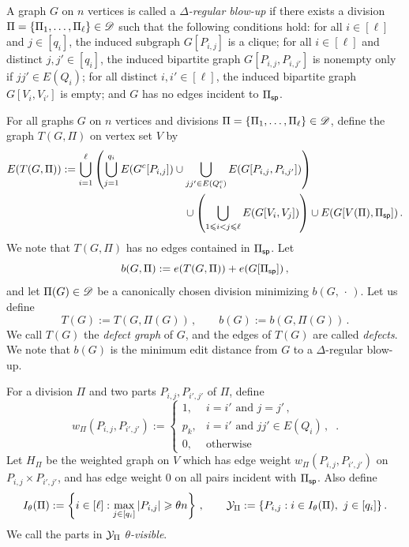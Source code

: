 \begin{definition}\label{dfn:D-reg-blowup}
A graph $G$ on $n$ vertices is called a \emph{$\Delta$-regular blow-up} if there exists a division $\Pi=\{\Pi_1,\dots,\Pi_\ell\}\in{\mathscr D}$ such that the following conditions hold: for all $i\in[\ell]$ and $j\in[q_i]$, the induced subgraph $G[P_{i,j}]$ is a clique; for all $i\in[\ell]$ and distinct $j,j'\in[q_i]$, the induced bipartite graph $G[P_{i,j},P_{i,j'}]$ is nonempty only if $jj'\in E(Q_i)$; for all distinct $i,i'\in[\ell]$, the induced bipartite graph $G[V_i,V_{i'}]$ is empty; and $G$ has no edges incident to $\Pi_{\mathsf{sp}}$.
\end{definition}

For all graphs $G$ on $n$ vertices and divisions $\Pi=\{\Pi_1,\dots,\Pi_\ell\}\in{\mathscr D}$, define the graph $T(G,\Pi)$ on vertex set $V$ by
\begin{align*}
E(T(G,\Pi)) &:= \bigcup_{i=1}^\ell\left(\bigcup_{j=1}^{q_i}E(G^c[P_{i,j}])\cup\bigcup_{jj'\in E(Q_i^c)}E(G[P_{i,j},P_{i,j'}])\right) \\
&\hspace{4cm}\cup\left(\bigcup_{1\leq i<j\leq\ell}E(G[V_i,V_j])\right)\cup E(G[V(\Pi),\Pi_\sparse]) \,.
\end{align*}
We note that $T(G,\Pi)$ has no edges contained in $\Pi_{\mathsf{sp}}$.
Let
$$b(G,\Pi):=e(T(G,\Pi))+e(G[\Pi_{\mathsf{sp}}])\,,$$
and let $\Pi(G)\in{\mathscr D}$ be a canonically chosen division minimizing $b(G,\,\cdot\,)$. Let us define
$$T(G):=T(G,\Pi(G))\,,\qquad b(G):=b(G,\Pi(G))\,.$$
We call $T(G)$ the \emph{defect graph} of $G$, and the edges of $T(G)$ are called \emph{defects}. We note that $b(G)$ is the minimum edit distance from $G$ to a $\Delta$-regular blow-up.

For a division $\Pi$ and two parts $P_{i,j},P_{i',j'}$ of $\Pi$, define
$$w_\Pi(P_{i,j},P_{i',j'}):=\begin{cases}1,&i=i'\text{ and }j=j'\,,\\p_k,&i=i'\text{ and }jj'\in E(Q_i)\,,\\0,&\text{otherwise}
\end{cases}\,.$$
Let $H_\Pi$ be the weighted graph on $V$ which has edge weight $w_\Pi(P_{i,j},P_{i',j'})$ on $P_{i,j}\times P_{i',j'}$, and has edge weight $0$ on all pairs incident with $\Pi_{\mathsf{sp}}$. Also define
$$I_\theta(\Pi):=\left\{i\in[\ell]:\max_{j\in[q_i]}|P_{i,j}|\geq\theta n\right\}\,,\qquad \cY_\Pi:=\{P_{i,j}:i\in I_\theta(\Pi),\ j\in[q_i]\}\,.$$
We call the parts in ${\mathcal Y}_\Pi$ \emph{$\theta$-visible}.

